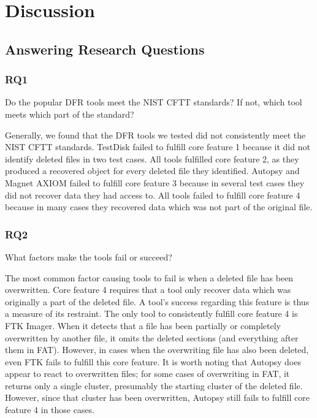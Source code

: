 \section{Discussion}

\subsection{Answering Research Questions}
\subsubsection{RQ1}
Do the popular DFR tools meet the NIST CFTT standards? 
If not, which tool meets which part of the standard? 

Generally, we found that the DFR tools we tested did not consistently meet the NIST CFTT standards.
TestDisk failed to fulfill core feature 1 because it did not identify deleted files in two test cases.
All tools fulfilled core feature 2, as they produced a recovered object for every deleted file they identified.
Autopsy and Magnet AXIOM failed to fulfill core feature 3 because in several test cases they did not recover data they had access to.
All tools failed to fulfill core feature 4 because in many cases they recovered data which was not part of the original file.

\subsubsection{RQ2}
What factors make the tools fail or succeed?

The most common factor causing tools to fail is when a deleted file has been overwritten.
Core feature 4 requires that a tool only recover data which was originally a part of the deleted file.
A tool's success regarding this feature is thus a measure of its restraint.
The only tool to consistently fulfill core feature 4 is FTK Imager.
When it detects that a file has been partially or completely overwritten by another file, it omits the deleted sections (and everything after them in FAT).
However, in cases when the overwriting file has also been deleted, even FTK fails to fulfill this core feature.
It is worth noting that Autopsy does appear to react to overwritten files; for some cases of overwriting in FAT, it returns only a single cluster, presumably the starting cluster of the deleted file.
However, since that cluster has been overwritten, Autopsy still fails to fulfill core feature 4 in those cases.

